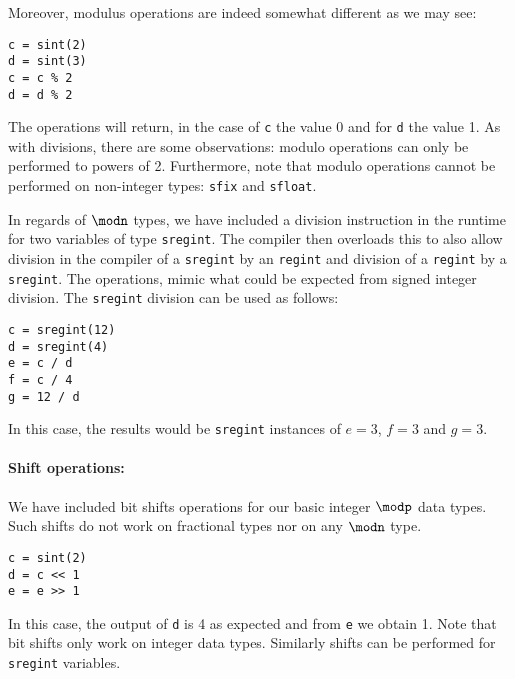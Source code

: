 Moreover,  modulus operations are indeed somewhat different as we may see: 
\begin{lstlisting}
c = sint(2)
d = sint(3)
c = c % 2
d = d % 2
\end{lstlisting}
The operations will return, in the case of \verb|c| the value 0 and for \verb|d| 
the value 1. 
As with divisions, there are some observations: 
modulo operations can only be performed to powers of 2. 
Furthermore, note that modulo operations cannot be performed 
on non-integer types: \verb|sfix| and \verb|sfloat|.

In regards of $\modn$ types, we have included a division instruction in
the runtime for two variables of type \verb|sregint|. 
The compiler then overloads this to also allow division in the compiler
of a \verb|sregint| by an \verb|regint| and division of a \verb|regint|
by a \verb|sregint|.
The operations, mimic what could be expected from signed integer division. 
The \verb|sregint| division  can be used as follows:
\begin{lstlisting}
c = sregint(12)
d = sregint(4)
e = c / d
f = c / 4
g = 12 / d
\end{lstlisting}
In this case, the results would be \verb|sregint| instances of $ e = 3$, $f = 3$
and $g=3$.

\paragraph{Shift operations:}
We have included bit shifts operations for our basic integer $\modp$ data types. 
Such shifts do not work on fractional types nor on any $\modn$ type. 
\begin{lstlisting}
c = sint(2)
d = c << 1
e = e >> 1 
\end{lstlisting}
In this case, the output of \verb|d| is 4 as expected and from \verb|e| we obtain 1. 
Note that bit shifts only work on integer data types.
Similarly shifts can be performed for \verb|sregint| variables.


